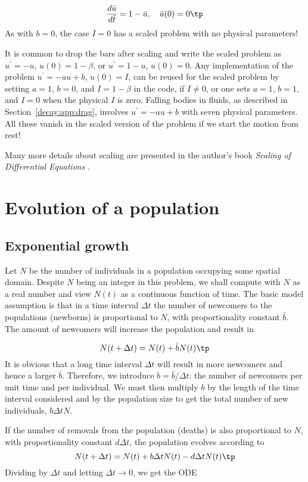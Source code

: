 \documentclass[graybox,sectrefs,envcountresetchap,open=right,final]{svmonodo}
\begin{document}
\[ \frac{d\bar u}{d\bar t} = 1 -\bar u,\quad \bar u(0)=0\tp\]
As with $b=0$, the case $I=0$ has a scaled problem with no physical
parameters!

It is common to drop the bars after scaling and write the scaled
problem as $u^{\prime}=-u$, $u(0)=1-\beta$, or $u^{\prime}=1-u$, $u(0)=0$.
Any implementation of the problem $u^{\prime}=-au+b$, $u(0)=I$, can be
reused for the scaled problem by setting $a=1$, $b=0$, and $I=1-\beta$
in the code, if $I\neq 0$, or one sets
$a=1$, $b=1$, and $I=0$ when the physical $I$ is zero.
Falling bodies in fluids, as described in Section~\ref{decay:app:drag},
involves $u^{\prime}=-au+b$ with seven physical parameters. All these vanish
in the scaled version of the problem if we start the motion from rest!

Many more details about scaling are presented in the author's book
\emph{Scaling of Differential Equations} \cite{Langtangen_scaling}.

\section{Evolution of a population}
\label{decay:app:pop}


\subsection{Exponential growth}
\label{decay:app:pop:exp}

Let $N$ be the number of individuals in a population occupying some
spatial domain.  Despite $N$ being an integer in this problem, we
shall compute with $N$ as a real number and view $N(t)$ as a
continuous function of time.  The basic model assumption is that in a
time interval $\Delta t$ the number of newcomers to the populations
(newborns) is proportional to $N$, with proportionality constant $\bar
b$. The amount of newcomers will increase the population and result in

\[ N(t+\Delta t) = N(t) + \bar bN(t)\tp  \]
It is obvious that a long time interval $\Delta t$ will result in
more newcomers and hence a larger $\bar b$. Therefore, we introduce
$b=\bar b/\Delta t$: the number of newcomers per unit time and per
individual. We must then multiply $b$ by the length of the time
interval considered and by the population size to get the
total number of new individuals, $b\Delta t N$.

If the number of removals from the population (deaths) is also
proportional to $N$, with proportionality constant $d\Delta t$,
the population evolves according to
\[ N(t+\Delta t) = N(t) + b\Delta t N(t) - d\Delta t N(t)\tp  \]
Dividing by $\Delta t$ and letting $\Delta t \rightarrow 0$,
we get the ODE
\end{document}
